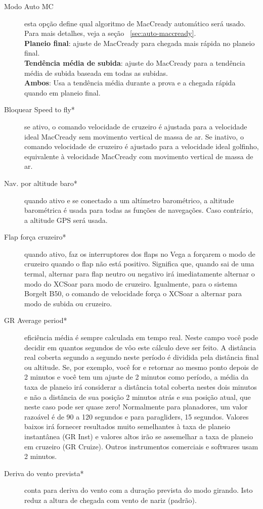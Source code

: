 \begin{description}
\item[Modo Auto MC]  esta opção define qual algoritmo de MacCready automático será usado. Para mais detalhes, veja a seção ~\ref{sec:auto-maccready}. \\
  {\bf Planeio final}: ajuste de MacCready para chegada mais rápida no planeio final.
 \\
  {\bf Tendência média de subida}: ajuste do MacCready para a tendência média de subida baseada em todas as subidas. \\
  {\bf Ambos}: Usa a tendência média durante a prova e a chegada rápida quando em planeio final.
\item[Bloquear Speed to fly*]  se ativo, o comando velocidade de cruzeiro é ajustada para a velocidade ideal MacCready sem movimento vertical de massa de ar.  Se inativo, o comando velocidade de cruzeiro é ajustado para a velocidade ideal golfinho, equivalente à velocidade MacCready com movimento vertical de massa de ar.
\item[Nav. por altitude baro*]  quando ativo e se conectado a um altímetro barométrico, a altitude barométrica é usada para todas as funções de navegações.  Caso contrário, a altitude GPS será usada.
\item[Flap força cruzeiro*]
 quando ativo, faz os interruptores dos flaps no Vega a forçarem o modo de cruzeiro quando o flap não está positivo. Significa que, quando sai de uma termal, alternar para flap neutro ou negativo irá imediatamente alternar o modo do XCSoar para modo de cruzeiro.  Igualmente, para o sistema Borgelt B50, o comando de velocidade força o XCSoar a alternar para modo de subida ou cruzeiro.
\item[GR Average period*]  eficiência média é sempre calculada em tempo real.  Neste campo você pode decidir em quantos segundos de vôo este cálculo deve ser feito.  A distância real coberta segundo a segundo neste período é dividida pela distância final ou altitude.  Se, por exemplo, você for e retornar ao mesmo ponto depois de 2 minutos e você tem um ajuste de 2 minutos como período, a média da taxa de planeio irá considerar a distância total coberta nestes dois minutos e não a distância de sua posição 2 minutos atrás e sua posição atual, que neste caso pode ser quase zero!  Normalmente para planadores, um valor razoável é de 90 a 120 segundos e para paragliders, 15 segundos.  Valores baixos irá fornecer resultados muito semelhantes à taxa de planeio instantânea (GR Inst) e valores altos irão se assemelhar a taxa de planeio em cruzeiro (GR Cruize).  Outros instrumentos comerciais e softwares usam 2 minutos.
\item[Deriva do vento prevista*]  \label{conf:predict-drift}conta para deriva do vento com a duração prevista do modo girando.  Isto reduz a altura de chegada com vento de nariz (padrão).
\end{description}


